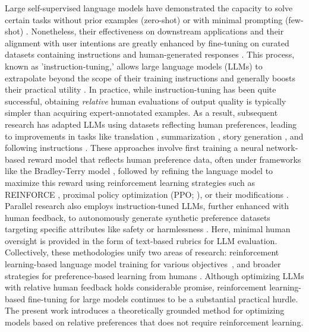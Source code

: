 Large self-supervised language models have demonstrated the capacity to solve certain tasks without prior examples (zero-shot) \citep{radford2019language} or with minimal prompting (few-shot) \citep{gpt3,megatron,chowdhery2022palm}. Nonetheless, their effectiveness on downstream applications and their alignment with user intentions are greatly enhanced by fine-tuning on curated datasets containing instructions and human-generated responses \citep{mishra-etal-2022-cross,sanh2022multitask,chung2022scaling,thoppilan2022lamda}. This process, known as 'instruction-tuning,' allows large language models (LLMs) to extrapolate beyond the scope of their training instructions and generally boosts their practical utility \citep{chung2022scaling}. In practice, while instruction-tuning has been quite successful, obtaining \textit{relative} human evaluations of output quality is typically simpler than acquiring expert-annotated examples. As a result, subsequent research has adapted LLMs using datasets reflecting human preferences, leading to improvements in tasks like translation \citep{kreutzer-etal-2018-reliability}, summarization \citep{stiennon2022learning,ziegler2020finetuning}, story generation \citep{ziegler2020finetuning}, and following instructions \citep{ouyang2022training,ramamurthy2023is}. These approaches involve first training a neural network-based reward model that reflects human preference data, often under frameworks like the Bradley-Terry model \citep{bradley1952rankanalysis}, followed by refining the language model to maximize this reward using reinforcement learning strategies such as REINFORCE \citep{williams1992reinforce}, proximal policy optimization (PPO; \cite{schulman2017proximal}), or their modifications \citep{ramamurthy2023is}. Parallel research also employs instruction-tuned LLMs, further enhanced with human feedback, to autonomously generate synthetic preference datasets targeting specific attributes like safety or harmlessness \citep{bai2022constitutional}. Here, minimal human oversight is provided in the form of text-based rubrics for LLM evaluation. Collectively, these methodologies unify two areas of research: reinforcement learning-based language model training for various objectives~\citep{Ranzato2015SequenceLT,paulus2018a,wu2018learning}, and broader strategies for preference-based learning from humans \citep{christiano2017deep,kupcsik2018learning}. Although optimizing LLMs with relative human feedback holds considerable promise, reinforcement learning-based fine-tuning for large models continues to be a substantial practical hurdle. The present work introduces a theoretically grounded method for optimizing models based on relative preferences that does not require reinforcement learning.

